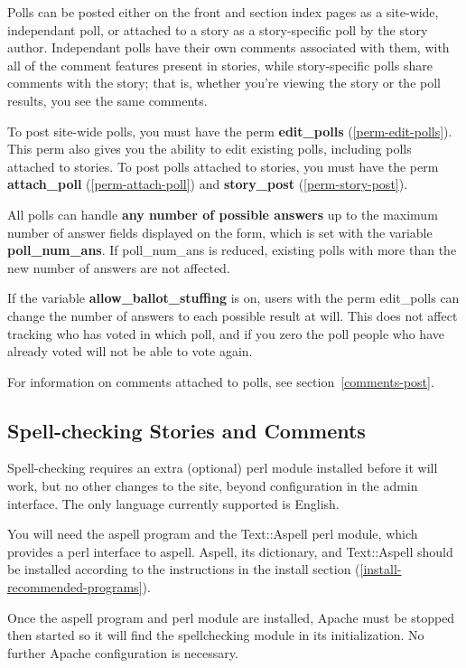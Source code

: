 Polls can be posted either on the front and section index pages as a site-wide, independant poll, or attached to a story as a story-specific poll by the story author.  Independant polls have their own comments associated with them, with all of the comment features present in stories, while story-specific polls share comments with the story; that is, whether you're viewing the story or the poll results, you see the same comments.

To post site-wide polls, you must have the perm {\bf edit\_polls} (\ref{perm-edit-polls}).  This perm also gives you the ability to edit existing polls, including polls attached to stories.  To post polls attached to stories, you must have the perm {\bf attach\_poll} (\ref{perm-attach-poll}) and {\bf story\_post} (\ref{perm-story-post}).

All polls can handle {\bf any number of possible answers} up to the maximum number of answer fields displayed on the form, which is set with the variable {\bf poll\_num\_ans}.  If poll\_num\_ans is reduced, existing polls with more than the new number of answers are not affected.

If the variable {\bf allow\_ballot\_stuffing} is on, users with the perm edit\_polls can change the number of answers to each possible result at will.  This does not affect tracking who has voted in which poll, and if you zero the poll people who have already voted will not be able to vote again.

For information on comments attached to polls, see section~\ref{comments-post}.

\subsection{Spell-checking Stories and Comments}
\label{features-spellcheck}

Spell-checking requires an extra (optional) perl module installed before it will work, but no other changes to the site, beyond configuration in the admin interface.  The only language currently supported is English.

You will need the aspell program and the Text::Aspell perl module, which provides a perl interface to aspell.  Aspell, its dictionary, and Text::Aspell should be installed according to the instructions in the install section (\ref{install-recommended-programs}).

Once the aspell program and perl module are installed, Apache must be stopped then started so it will find the spellchecking module in its initialization.  No further Apache configuration is necessary.

